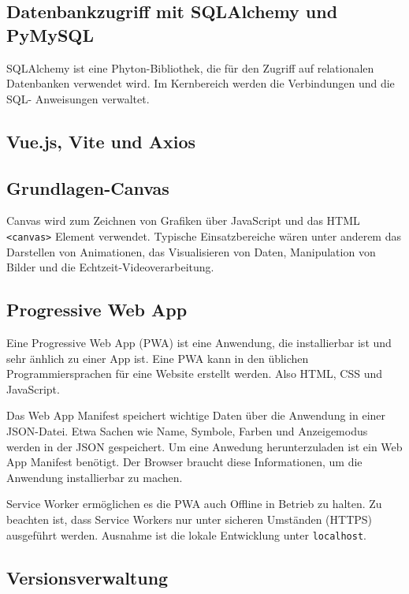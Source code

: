 \subsection{Datenbankzugriff mit SQLAlchemy und PyMySQL}
SQLAlchemy ist eine Phyton-Bibliothek, die für den Zugriff auf relationalen
Datenbanken verwendet wird. Im Kernbereich werden die Verbindungen und die SQL-
Anweisungen verwaltet. 
\subsection{Vue.js, Vite und Axios}

\subsection{Grundlagen-Canvas}
Canvas wird zum Zeichnen von Grafiken über JavaScript und das HTML
\texttt{<canvas>} Element verwendet. Typische Einsatzbereiche wären unter anderem
das Darstellen von Animationen, das Visualisieren von Daten, Manipulation von Bilder 
und die Echtzeit-Videoverarbeitung. 

\subsection{Progressive Web App}
Eine Progressive Web App (PWA) ist eine Anwendung, die installierbar ist und
sehr änhlich zu einer App ist\cite{mdn_pwa}. Eine PWA kann in den üblichen 
Programmiersprachen für eine Website erstellt werden. Also HTML, CSS und JavaScript.

Das Web App Manifest speichert wichtige Daten über die Anwendung in einer JSON-Datei. 
Etwa Sachen wie Name, Symbole, Farben und Anzeigemodus werden in der JSON gespeichert. 
Um eine Anwedung herunterzuladen ist ein Web App Manifest benötigt. 
Der Browser braucht diese Informationen, um die Anwendung installierbar zu machen.\cite{mdn_pwa}

Service Worker ermöglichen es die PWA auch Offline in Betrieb zu halten. 
Zu beachten ist, dass Service Workers nur unter sicheren Umständen (HTTPS) 
ausgeführt werden. Ausnahme ist die lokale Entwicklung unter \texttt{localhost}. 




\subsection{Versionsverwaltung}





